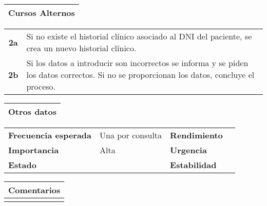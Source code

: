 \documentclass[11pt,a4paper]{article}
\begin{document}
\begin{table}[H]
	\begin{tabularx}{\textwidth}{X}
		\textbf{Cursos Alternos}\\ \hline
	\end{tabularx}
	\begin{tabularx}{\textwidth}{cX}
		\textbf{2a} & Si no existe el historial clínico asociado al DNI del paciente, se crea un nuevo historial clínico.\\
		\textbf{2b} & Si los datos a introducir son incorrectos se informa y se piden los datos correctos. Si no se proporcionan los datos, concluye el proceso. \\
	\end{tabularx}
\end{table}

\begin{table}[H]
	\begin{tabularx}{\textwidth}{X}
		\textbf{Otros datos}\\ \hline
	\end{tabularx}
	\begin{tabularx}{\textwidth}{lXlX}
		\textbf{Frecuencia esperada} & Una por consulta & \textbf{Rendimiento} & \\
		\textbf{Importancia} & Alta & \textbf{Urgencia} & \\
		\textbf{Estado} &  & \textbf{Estabilidad} & \\
	\end{tabularx}
	
	\bigskip
	
	\begin{tabularx}{\textwidth}{X}
		\textbf{Comentarios}\\ \hline
		[...] \\
	\end{tabularx}
\end{table}


\newpage




\end{document}

